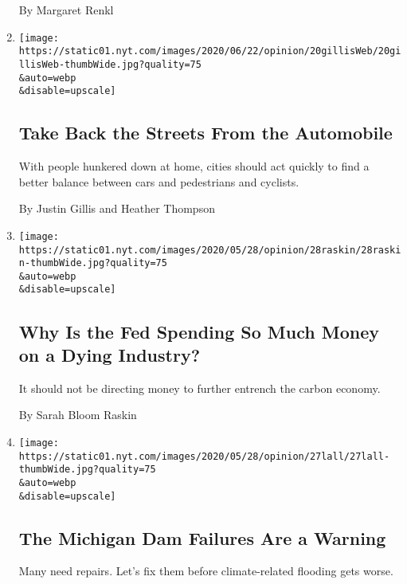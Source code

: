\begin{enumerate}
  By Margaret Renkl
\item
  \href{/2020/06/20/opinion/pandemic-automobile-cities.html}{}

  \texttt{[image: https://static01.nyt.com/images/2020/06/22/opinion/20gillisWeb/20gillisWeb-thumbWide.jpg?quality=75\\\&auto=webp\\\&disable=upscale]}

  \hypertarget{take-back-the-streets-from-the-automobile}{%
  \subsection{Take Back the Streets From the
  Automobile}\label{take-back-the-streets-from-the-automobile}}

  With people hunkered down at home, cities should act quickly to find a
  better balance between cars and pedestrians and cyclists.

  By Justin Gillis and Heather Thompson
\item
  \href{/2020/05/28/opinion/fed-fossil-fuels.html}{}

  \texttt{[image: https://static01.nyt.com/images/2020/05/28/opinion/28raskin/28raskin-thumbWide.jpg?quality=75\\\&auto=webp\\\&disable=upscale]}

  \hypertarget{why-is-the-fed-spending-so-much-money-on-a-dying-industry}{%
  \subsection{Why Is the Fed Spending So Much Money on a Dying
  Industry?}\label{why-is-the-fed-spending-so-much-money-on-a-dying-industry}}

  It should not be directing money to further entrench the carbon
  economy.

  By Sarah Bloom Raskin
\item
  \href{/2020/05/27/opinion/michigan-edenville-dam.html}{}

  \texttt{[image: https://static01.nyt.com/images/2020/05/28/opinion/27lall/27lall-thumbWide.jpg?quality=75\\\&auto=webp\\\&disable=upscale]}

  \hypertarget{the-michigan-dam-failures-are-a-warning}{%
  \subsection{The Michigan Dam Failures Are a
  Warning}\label{the-michigan-dam-failures-are-a-warning}}

  Many need repairs. Let's fix them before climate-related flooding gets
  worse.


\end{enumerate}
